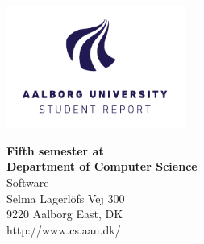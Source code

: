 

{}
\thispagestyle{empty}

\begin{minipage}[t]{0.48\textwidth}
\vspace*{-25pt}			%
\includegraphics[height=4cm]{billeder/AAU-logo-stud-UK-RGB}
\end{minipage}
\hfill
\begin{minipage}[t]{0.48\textwidth}
{\small 
\textbf{Fifth semester at}\\
\textbf{Department of Computer Science}  \\
Software \\
Selma Lagerlöfs Vej 300 \\
9220 Aalborg East, DK \\
http://www.cs.aau.dk/}
\end{minipage}

\vspace*{1cm}

